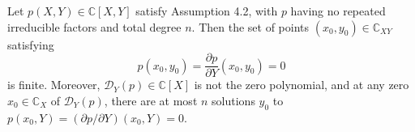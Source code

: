 Let $p(X, Y) \in \mathbb{C}[X, Y]$ satisfy Assumption 4.2, with $p$ having no repeated irreducible factors and total degree $n$. Then the set of points $(x_0, y_0) \in \mathbb{C}_{XY}$ satisfying
$$p(x_0, y_0) = \frac{\partial p}{\partial Y}(x_0, y_0) = 0$$
is finite. Moreover, $\mathcal{D}_Y(p) \in \mathbb{C}[X]$ is not the zero polynomial, and at any zero $x_0 \in \mathbb{C}_X$ of $\mathcal{D}_Y(p)$, there are at most $n$ solutions $y_0$ to $p(x_0, Y) = (\partial p / \partial Y)(x_0, Y) = 0$.
